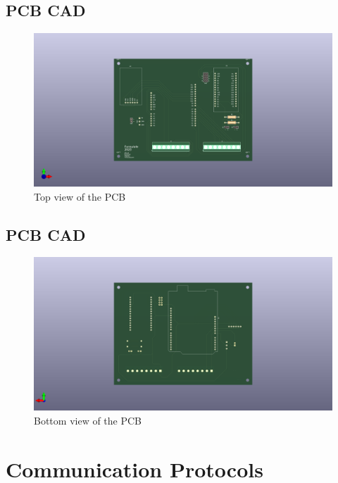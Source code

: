 \documentclass[12pt, titlepage]{article}
\begin{document}
\subsection{PCB CAD}
\begin{figure}[h!]
  \begin{center}
  \includegraphics[width=1.0\textwidth]{PCB_Front_View}
  \caption{Top view of the PCB}
  \end{center}
  \end{figure}
  \newpage

\subsection{PCB CAD}
\begin{figure}[h!]
  \begin{center}
  \includegraphics[width=1.0\textwidth]{PCB_Back_View}
  \caption{Bottom view of the PCB}
  \end{center}
  \end{figure}
  \newpage

\section{Communication Protocols}
\end{document}
